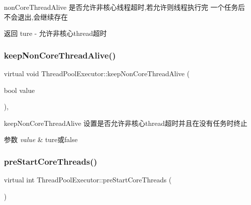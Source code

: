 non\+Core\+Thread\+Alive 是否允许非核心线程超时,若允许则线程执行完 一个任务后不会退出,会继续存在 

\begin{DoxyReturn}{返回}
ture -\/ 允许非核心thread超时 
\end{DoxyReturn}
\mbox{\label{classThreadPoolExecutor_a7e6ed2d088147377d1e82018ac3dac1d}} 
\subsubsection{\texorpdfstring{keep\+Non\+Core\+Thread\+Alive()}{keepNonCoreThreadAlive()}\hspace{0.1cm}{\footnotesize\ttfamily [2/2]}}
{\footnotesize\ttfamily virtual void Thread\+Pool\+Executor\+::keep\+Non\+Core\+Thread\+Alive (\begin{DoxyParamCaption}\item[{bool}]{value }\end{DoxyParamCaption})\hspace{0.3cm}{\ttfamily [final]}, {\ttfamily [virtual]}}



keep\+Non\+Core\+Thread\+Alive 设置是否允许非核心thread超时并且在没有任务时终止 


\begin{DoxyParams}{参数}
{\em value} & ture或false \\
\hline
\end{DoxyParams}
\mbox{\label{classThreadPoolExecutor_aab8b3946a87fbecd144b159c12c8bcfb}} 
\subsubsection{\texorpdfstring{pre\+Start\+Core\+Threads()}{preStartCoreThreads()}}
{\footnotesize\ttfamily virtual int Thread\+Pool\+Executor\+::pre\+Start\+Core\+Threads (\begin{DoxyParamCaption}{ }\end{DoxyParamCaption})\hspace{0.3cm}{\ttfamily [virtual]}}



